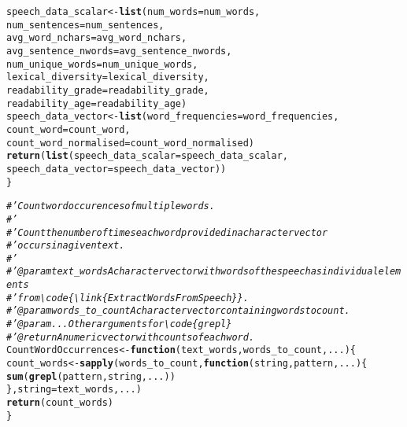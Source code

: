 \documentclass{article}\usepackage[]{graphicx}\usepackage[]{color}
\makeatletter
\newcommand{\hlcom}[1]{\textcolor[rgb]{0.678,0.584,0.686}{\textit{#1}}}%
\newcommand{\hlstd}[1]{\textcolor[rgb]{0.345,0.345,0.345}{#1}}%
\newcommand{\hlkwa}[1]{\textcolor[rgb]{0.161,0.373,0.58}{\textbf{#1}}}%
\newcommand{\hlkwb}[1]{\textcolor[rgb]{0.69,0.353,0.396}{#1}}%
\newcommand{\hlkwc}[1]{\textcolor[rgb]{0.333,0.667,0.333}{#1}}%
\newcommand{\hlkwd}[1]{\textcolor[rgb]{0.737,0.353,0.396}{\textbf{#1}}}%
\newenvironment{kframe}{%
 \def\at@end@of@kframe{}%
 \ifinner\ifhmode%
  \def\at@end@of@kframe{\end{minipage}}%
  \begin{minipage}{\columnwidth}%
 \fi\fi%
 \def\FrameCommand##1{\hskip\@totalleftmargin \hskip-\fboxsep
 \colorbox{shadecolor}{##1}\hskip-\fboxsep
     \hskip-\linewidth \hskip-\@totalleftmargin \hskip\columnwidth}%
 \MakeFramed {\advance\hsize-\width
   \@totalleftmargin\z@ \linewidth\hsize
   \@setminipage}}%
 {\par\unskip\endMakeFramed%
 \at@end@of@kframe}
\newenvironment{knitrout}{}{} %
\makeatother
\begin{document}
\begin{knitrout}
\begin{kframe}
\begin{alltt}
  \hlstd{speech_data_scalar} \hlkwb{<-} \hlkwd{list}\hlstd{(}\hlkwc{num_words} \hlstd{= num_words,}
                             \hlkwc{num_sentences} \hlstd{= num_sentences,}
                             \hlkwc{avg_word_nchars} \hlstd{= avg_word_nchars,}
                             \hlkwc{avg_sentence_nwords} \hlstd{= avg_sentence_nwords,}
                             \hlkwc{num_unique_words} \hlstd{= num_unique_words,}
                             \hlkwc{lexical_diversity} \hlstd{= lexical_diversity,}
                             \hlkwc{readability_grade} \hlstd{= readability_grade,}
                             \hlkwc{readability_age} \hlstd{= readability_age)}
  \hlstd{speech_data_vector} \hlkwb{<-} \hlkwd{list}\hlstd{(}\hlkwc{word_frequencies} \hlstd{= word_frequencies,}
                             \hlkwc{count_word} \hlstd{= count_word,}
                             \hlkwc{count_word_normalised} \hlstd{= count_word_normalised)}
  \hlkwd{return}\hlstd{(}\hlkwd{list}\hlstd{(}\hlkwc{speech_data_scalar} \hlstd{= speech_data_scalar,}
              \hlkwc{speech_data_vector} \hlstd{= speech_data_vector))}
\hlstd{\}}

\hlcom{#' Count word occurences of multiple words.}
\hlcom{#' }
\hlcom{#' Count the number of times each word provided in a character vector }
\hlcom{#' occurs in a given text.}
\hlcom{#' }
\hlcom{#' @param text_words A character vector with words of the speech as individual elements }
\hlcom{#' from \textbackslash{}code\{\textbackslash{}link\{ExtractWordsFromSpeech\}\}.}
\hlcom{#' @param words_to_count A character vector containing words to count.}
\hlcom{#' @param ... Other arguments for \textbackslash{}code\{grepl\}}
\hlcom{#' @return A numeric vector with counts of each word.}
\hlstd{CountWordOccurrences} \hlkwb{<-} \hlkwa{function}\hlstd{(}\hlkwc{text_words}\hlstd{,} \hlkwc{words_to_count}\hlstd{,} \hlkwc{...}\hlstd{) \{}
  \hlstd{count_words} \hlkwb{<-} \hlkwd{sapply}\hlstd{(words_to_count,} \hlkwa{function}\hlstd{(}\hlkwc{string}\hlstd{,} \hlkwc{pattern}\hlstd{,} \hlkwc{...}\hlstd{) \{}
    \hlkwd{sum}\hlstd{(}\hlkwd{grepl}\hlstd{(pattern, string, ...))}
  \hlstd{\},} \hlkwc{string} \hlstd{= text_words, ...)}
  \hlkwd{return}\hlstd{(count_words)}
\hlstd{\}}


\end{alltt}
\end{kframe}
\end{knitrout}
\end{document}
